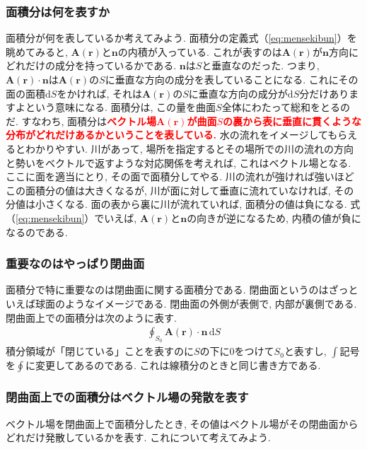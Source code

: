 \subsubsection{面積分は何を表すか}
面積分が何を表しているか考えてみよう. 
面積分の定義式（\ref{eq:mensekibun}）を眺めてみると, $\bm{A}(\bm{r})$と$\bm{n}$の内積が入っている. 
これが表すのは$\bm{A}(\bm{r})$が$\bm{n}$方向にどれだけの成分を持っているかである. 
$\bm{n}$は$S$と垂直なのだった. 
つまり, $\bm{A}(\bm{r}) \cdot \bm{n}$は$\bm{A}(\bm{r})$の$S$に垂直な方向の成分を表していることになる. 
これにその面の面積$\mathrm{d}S$をかければ, 
それは$\bm{A}(\bm{r})$の$S$に垂直な方向の成分が$\mathrm{d}S$分だけありますよという意味になる. 
面積分は, この量を曲面$S$全体にわたって総和をとるのだ. 
すなわち, 面積分は\textbf{\textcolor{red}{ベクトル場$\bm{A}(\bm{r})$が曲面$S$の裏から表に垂直に貫くような
分布がどれだけあるかということを表している.}}
水の流れをイメージしてもらえるとわかりやすい. 
川があって, 場所を指定するとその場所での川の流れの方向と勢いをベクトルで返すような対応関係を考えれば, これはベクトル場となる. 
ここに面を適当にとり, その面で面積分してやる. 川の流れが強ければ強いほどこの面積分の値は大きくなるが, 
川が面に対して垂直に流れていなければ, その分値は小さくなる. 
面の表から裏に川が流れていれば, 面積分の値は負になる. 式（\ref{eq:mensekibun}）でいえば, 
$\bm{A}(\bm{r})$と$\bm{n}$の向きが逆になるため, 内積の値が負になるのである. 

\subsubsection{重要なのはやっぱり閉曲面}
面積分で特に重要なのは閉曲面に関する面積分である. 閉曲面というのはざっといえば球面のようなイメージである. 
閉曲面の外側が表側で, 内部が裏側である. 
閉曲面上での面積分は次のように表す. 
\begin{eqnarray}
\oint_{S_0} \bm{A}(\bm{r}) \cdot \bm{n} \, \mathrm{d}S
\label{eq:heimensekibun}
\end{eqnarray}
積分領域が「閉じている」ことを表すのに$S$の下に0をつけて$S_0$と表すし, $\int$記号を$\oint$に変更してあるのである. 
これは線積分のときと同じ書き方である. 

\subsubsection{閉曲面上での面積分はベクトル場の発散を表す}
ベクトル場を閉曲面上で面積分したとき, 
その値はベクトル場がその閉曲面からどれだけ発散しているかを表す. 
これについて考えてみよう. 

